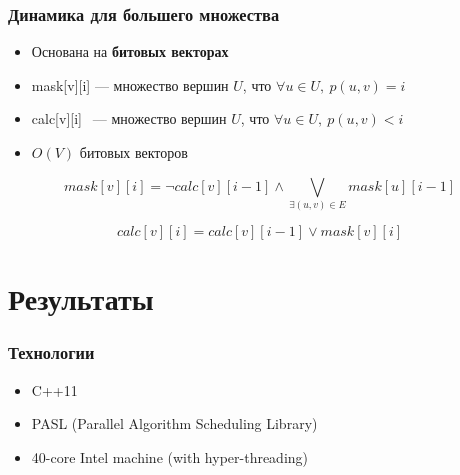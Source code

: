 \documentclass[10pt, compress]{beamer}
\begin{document}
\begin{frame}[fragile]
  \frametitle{Динамика для большего множества}
    \begin{itemize}
    	\item Основана на \textbf{битовых векторах}
		\item mask[v][i] --- множество вершин $U$, что $\forall u \in U, \ p(u, v) = i$
		\item calc[v][i] $ \ \ $--- множество вершин $U$, что  $\forall u \in U, \ p(u, v) < i$
		\item \textbf{$O(V)$} битовых векторов
	\end{itemize}
	
	\begin{equation}
mask[v][i] = \neg calc[v][i - 1] \wedge \bigvee_{\exists (u, v) \in E} mask[u][i - 1] 
\end{equation}

\begin{equation}
calc[v][i] = calc[v][i - 1] \vee mask[v][i]
\end{equation}

\end{frame}

\section{Результаты}

\begin{frame}[fragile]
  \frametitle{Технологии}
\begin{itemize}
    \item C++11
    \item PASL (Parallel Algorithm Scheduling Library)
    \item 40-core Intel machine (with hyper-threading) 
  \end{itemize}
\end{frame}


\end{document}
